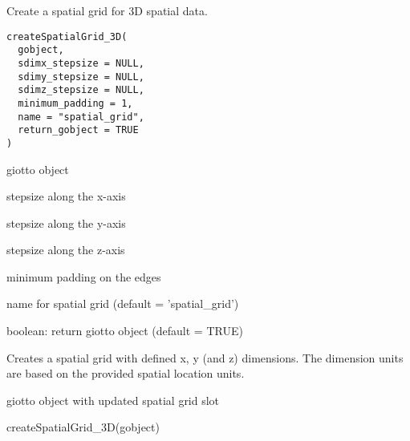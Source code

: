 \documentclass[a4paper]{book}
\begin{document}
%
\begin{Description}\relax
Create a spatial grid for 3D spatial data.
\end{Description}
%
\begin{Usage}
\begin{verbatim}
createSpatialGrid_3D(
  gobject,
  sdimx_stepsize = NULL,
  sdimy_stepsize = NULL,
  sdimz_stepsize = NULL,
  minimum_padding = 1,
  name = "spatial_grid",
  return_gobject = TRUE
)
\end{verbatim}
\end{Usage}
%
\begin{Arguments}
\begin{ldescription}
\item[\code{gobject}] giotto object

\item[\code{sdimx\_stepsize}] stepsize along the x-axis

\item[\code{sdimy\_stepsize}] stepsize along the y-axis

\item[\code{sdimz\_stepsize}] stepsize along the z-axis

\item[\code{minimum\_padding}] minimum padding on the edges

\item[\code{name}] name for spatial grid (default = 'spatial\_grid')

\item[\code{return\_gobject}] boolean: return giotto object (default = TRUE)
\end{ldescription}
\end{Arguments}
%
\begin{Details}\relax
Creates a spatial grid with defined x, y (and z) dimensions.
The dimension units are based on the provided spatial location units.
\end{Details}
%
\begin{Value}
giotto object with updated spatial grid slot
\end{Value}
%
\begin{Examples}
\begin{ExampleCode}
    createSpatialGrid_3D(gobject)
\end{ExampleCode}
\end{Examples}
\end{document}
